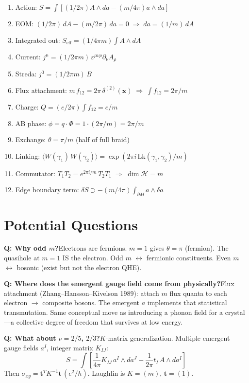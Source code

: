 \documentclass[11pt]{article}
\begin{document}
\begin{enumerate}[nosep]
\item Action: $S = \int [(1/2\pi)A\wedge da - (m/4\pi)a\wedge da]$
\item EOM: $(1/2\pi)\,dA - (m/2\pi)\,da = 0 \;\Rightarrow\; da = (1/m)\,dA$
\item Integrated out: $S_{\mathrm{eff}} = (1/4\pi m)\int A\wedge dA$
\item Current: $j^\mu = (1/2\pi m)\,\varepsilon^{\mu\nu\rho}\partial_\nu A_\rho$
\item Streda: $j^0 = (1/2\pi m)\,B$
\item Flux attachment: $m\,f_{12} = 2\pi\,\delta^{(2)}(\mathbf{x}) \;\Rightarrow\; \int f_{12} = 2\pi/m$
\item Charge: $Q = (e/2\pi)\int f_{12} = e/m$
\item AB phase: $\phi = q\cdot\Phi = 1\cdot(2\pi/m) = 2\pi/m$
\item Exchange: $\theta = \pi/m$ (half of full braid)
\item Linking: $\langle W(\gamma_1)\,W(\gamma_2)\rangle = \exp(2\pi i\,\mathrm{Lk}(\gamma_1,\gamma_2)/m)$
\item Commutator: $T_1 T_2 = e^{2\pi i/m}\,T_2 T_1 \;\Rightarrow\; \dim\mathcal{H} = m$
\item Edge boundary term: $\delta S \supset -(m/4\pi)\int_{\partial M} a\wedge\delta a$
\end{enumerate}

\section*{Potential Questions}

\textbf{Q: Why odd $m$?}\quad Electrons are fermions. $m=1$ gives $\theta=\pi$ (fermion). The quasihole at $m=1$ IS the electron. Odd $m$ $\leftrightarrow$ fermionic constituents. Even $m$ $\leftrightarrow$ bosonic (exist but not the electron QHE).

\medskip
\textbf{Q: Where does the emergent gauge field come from physically?}\quad Flux attachment (Zhang--Hansson--Kivelson 1989): attach $m$ flux quanta to each electron $\to$ composite bosons. The emergent $a$ implements that statistical transmutation. Same conceptual move as introducing a phonon field for a crystal---a collective degree of freedom that survives at low energy.

\medskip
\textbf{Q: What about $\nu = 2/5$, $2/3$?}\quad $K$-matrix generalization. Multiple emergent gauge fields $a^I$, integer matrix $K_{IJ}$:
\[S = \int\!\left[\frac{1}{4\pi}K_{IJ}\,a^I\!\wedge da^J + \frac{1}{2\pi}t_I\,A\wedge da^I\right]\]
Then $\sigma_{xy} = \mathbf{t}^T K^{-1}\mathbf{t}\,(e^2/h)$. Laughlin is $K=(m)$, $\mathbf{t}=(1)$.
\end{document}
